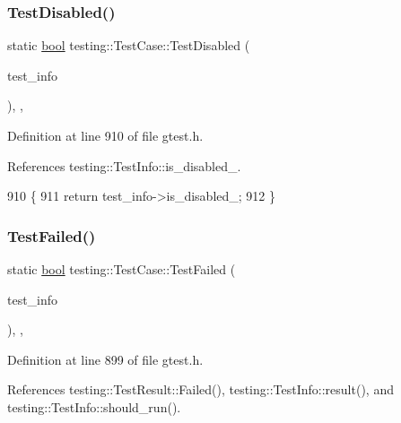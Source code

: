 \subsubsection{\texorpdfstring{Test\+Disabled()}{TestDisabled()}}
{\footnotesize\ttfamily static \hyperlink{classbool}{bool} testing\+::\+Test\+Case\+::\+Test\+Disabled (\begin{DoxyParamCaption}\item[{const \hyperlink{classtesting_1_1TestInfo}{Test\+Info} $\ast$}]{test\+\_\+info }\end{DoxyParamCaption})\hspace{0.3cm}{\ttfamily [inline]}, {\ttfamily [static]}, {\ttfamily [private]}}



Definition at line 910 of file gtest.\+h.



References testing\+::\+Test\+Info\+::is\+\_\+disabled\+\_\+.


\begin{DoxyCode}
910                                                       \{
911     \textcolor{keywordflow}{return} test\_info->is\_disabled\_;
912   \}
\end{DoxyCode}
\mbox{\label{classtesting_1_1TestCase_a5922884cb8b4819e869146dc315a1ac1}} 
\subsubsection{\texorpdfstring{Test\+Failed()}{TestFailed()}}
{\footnotesize\ttfamily static \hyperlink{classbool}{bool} testing\+::\+Test\+Case\+::\+Test\+Failed (\begin{DoxyParamCaption}\item[{const \hyperlink{classtesting_1_1TestInfo}{Test\+Info} $\ast$}]{test\+\_\+info }\end{DoxyParamCaption})\hspace{0.3cm}{\ttfamily [inline]}, {\ttfamily [static]}, {\ttfamily [private]}}



Definition at line 899 of file gtest.\+h.



References testing\+::\+Test\+Result\+::\+Failed(), testing\+::\+Test\+Info\+::result(), and testing\+::\+Test\+Info\+::should\+\_\+run().


